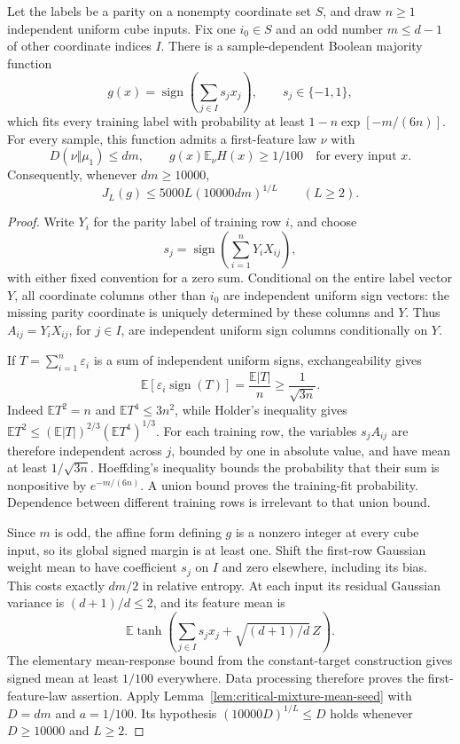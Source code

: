 \begin{lemma}
\label{lem:critical-oriented-majority}
Let the labels be a parity on a nonempty coordinate set $S$, and draw
$n\ge1$ independent uniform cube inputs. Fix one $i_0\in S$ and an
odd number $m\le d-1$ of other coordinate indices $I$.
There is a sample-dependent Boolean majority function
\[
 g(x)=\operatorname{sign}\!\left(\sum_{j\in I}s_jx_j\right),
 \qquad s_j\in\{-1,1\},
\]
which fits every training label with probability at least
$1-n\exp[-m/(6n)]$.
For every sample, this function admits a first-feature law $\nu$ with
\[
 D(\nu\Vert\mu_1)\le dm,
 \qquad g(x)\mathbb E_\nu H(x)\ge1/100
       \quad\text{for every input }x.
\]
Consequently, whenever $dm\ge10000$,
\[
 J_L(g)\le5000L(10000dm)^{1/L}
       \qquad(L\ge2).
\]
\end{lemma}

\begin{proof}
Write $Y_i$ for the parity label of training row $i$, and choose
\[
 s_j=\operatorname{sign}\!\left(\sum_{i=1}^nY_iX_{ij}\right),
\]
with either fixed convention for a zero sum.
Conditional on the entire label vector $Y$, all coordinate columns
other than $i_0$ are independent uniform sign vectors: the missing
parity coordinate is uniquely determined by these columns and $Y$.
Thus $A_{ij}=Y_iX_{ij}$, for $j\in I$, are independent uniform sign
columns conditionally on $Y$.

If $T=\sum_{i=1}^n\varepsilon_i$ is a sum of independent uniform
signs, exchangeability gives
\[
 \mathbb E\left[\varepsilon_i\operatorname{sign}(T)\right]
       =\frac{\mathbb E|T|}{n}\ge\frac1{\sqrt{3n}}.
\]
Indeed $\mathbb ET^2=n$ and $\mathbb ET^4\le3n^2$, while Holder's
inequality gives
$\mathbb ET^2\le(\mathbb E|T|)^{2/3}(\mathbb ET^4)^{1/3}$.
For each training row, the variables $s_jA_{ij}$ are therefore
independent across $j$, bounded by one in absolute value, and have
mean at least $1/\sqrt{3n}$. Hoeffding's inequality bounds the
probability that their sum is nonpositive by $e^{-m/(6n)}$.
A union bound proves the training-fit probability. Dependence between
different training rows is irrelevant to that union bound.

Since $m$ is odd, the affine form defining $g$ is a nonzero integer
at every cube input, so its global signed margin is at least one.
Shift the first-row Gaussian weight mean to have coefficient $s_j$
on $I$ and zero elsewhere, including its bias. This costs exactly
$dm/2$ in relative entropy. At each input its residual Gaussian
variance is $(d+1)/d\le2$, and its feature mean is
\[
 \mathbb E\tanh\!\left(\sum_{j\in I}s_jx_j+
                       \sqrt{(d+1)/d}\,Z\right).
\]
The elementary mean-response bound from the constant-target
construction gives signed mean at least $1/100$ everywhere.
Data processing therefore proves the first-feature-law assertion.
Apply Lemma~\ref{lem:critical-mixture-mean-seed} with
$D=dm$ and $a=1/100$. Its hypothesis
$(10000D)^{1/L}\le D$ holds whenever $D\ge10000$ and $L\ge2$.
\end{proof}
